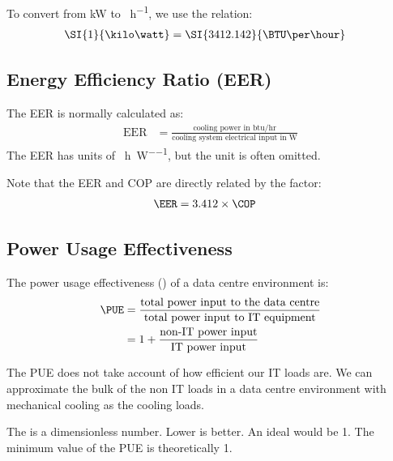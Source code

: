 \documentclass{pgnotes}
\begin{document}
To convert from \si{\kilo\watt} to \si{\BTU\per\hour}, we use the relation:
\begin{align}
  \SI{1}{\kilo\watt} & = \SI{3412.142}{\BTU\per\hour}
\end{align}

\subsection{Energy Efficiency Ratio (EER)}

The EER is normally calculated as:
\begin{align}
  \mbox{EER} & = \frac{\mbox{cooling power in btu/hr}}{\mbox{cooling system electrical input in W}}
\end{align}
The EER has units of \si{\BTU\per\hour\per\watt}, but the unit is often omitted.


Note that the EER and COP are directly related by the factor:
\begin{align}
  \EER & = 3.412 \times \COP
\end{align}

\subsection{Power Usage Effectiveness}

The power usage effectiveness (\PUE) of a data centre environment is:
\begin{align}
  \PUE & = \frac{\mbox{total power input to the data centre}}{\mbox{total power input to IT equipment}} \\
       & = 1 + \frac{\mbox{non-IT power input}}{\mbox{IT power input}}
\end{align}

The PUE does not take account of how efficient our IT loads are. 
We can approximate the bulk of the non IT loads in a data centre environment with mechanical cooling as the cooling loads.

The \PUE is a dimensionless number.
Lower is better.
An ideal \PUE would be 1.
The minimum value of the PUE is theoretically 1.
\end{document}
